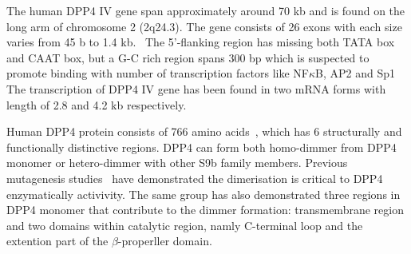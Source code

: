 The human DPP4 IV gene span approximately around 70 kb and is found on the long arm of chromosome 2 (2q24.3). The gene consists of 26 exons with each size varies from 45 b to 1.4 kb.~\cite{Abbott1994} The 5'-flanking region has missing both TATA box and CAAT box, but a G-C rich region spans 300 bp which is suspected to promote binding with number of transcription factors like NF$\kappa$B, AP2 and Sp1~\cite{Abbott1994,Böhm1995} The transcription of DPP4 IV gene has been found in two mRNA forms with length of 2.8 and 4.2 kb respectively. 
\par
Human DPP4 protein consists of 766 amino acids~\cite{Bär2003,Misumi1992}, which has 6 structurally and functionally distinctive regions. DPP4 can form both homo-dimmer from DPP4 monomer or hetero-dimmer with other S9b family members. Previous mutagenesis studies~\cite{Chien_2004,Chien_2006} have demonstrated the dimerisation is critical to DPP4 enzymatically activivity. The same group has also demonstrated three regions in DPP4 monomer that contribute to the dimmer formation: transmembrane region\cite{Chung_2010} and two domains within catalytic region, namly C-terminal loop and the extention part of the $\beta$-properller domain.    
